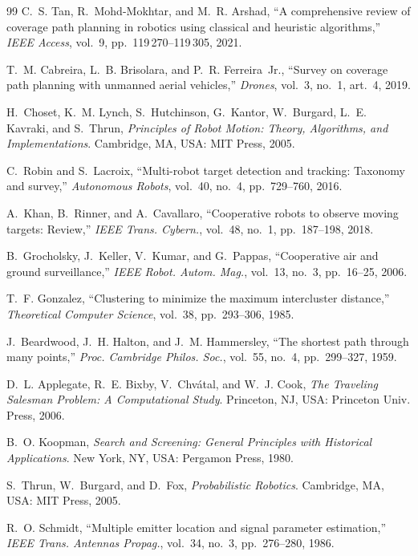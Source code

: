 \documentclass[preprint,12pt,3p]{elsarticle}
\theoremstyle{definition}
\begin{document}
\begin{thebibliography}{99}
C.~S. Tan, R.~Mohd-Mokhtar, and M.~R. Arshad, ``A comprehensive review of coverage path planning
in robotics using classical and heuristic algorithms,'' \emph{IEEE Access}, vol.~9,
pp.~119\,270--119\,305, 2021.

T.~M. Cabreira, L.~B. Brisolara, and P.~R. Ferreira~Jr., ``Survey on coverage path planning with
unmanned aerial vehicles,'' \emph{Drones}, vol.~3, no.~1, art.~4, 2019.

H.~Choset, K.~M. Lynch, S.~Hutchinson, G.~Kantor, W.~Burgard, L.~E. Kavraki, and S.~Thrun,
\emph{Principles of Robot Motion: Theory, Algorithms, and Implementations}. Cambridge, MA, USA:
MIT Press, 2005.

C.~Robin and S.~Lacroix, ``Multi-robot target detection and tracking: Taxonomy and survey,''
\emph{Autonomous Robots}, vol.~40, no.~4, pp.~729--760, 2016.

A.~Khan, B.~Rinner, and A.~Cavallaro, ``Cooperative robots to observe moving targets: Review,''
\emph{IEEE Trans. Cybern.}, vol.~48, no.~1, pp.~187--198, 2018.

B.~Grocholsky, J.~Keller, V.~Kumar, and G.~Pappas, ``Cooperative air and ground surveillance,''
\emph{IEEE Robot. Autom. Mag.}, vol.~13, no.~3, pp.~16--25, 2006.

T.~F. Gonzalez, ``Clustering to minimize the maximum intercluster distance,''
\emph{Theoretical Computer Science}, vol.~38, pp.~293--306, 1985.

J.~Beardwood, J.~H. Halton, and J.~M. Hammersley, ``The shortest path through many points,''
\emph{Proc. Cambridge Philos. Soc.}, vol.~55, no.~4, pp.~299--327, 1959.

D.~L. Applegate, R.~E. Bixby, V.~Chv\'atal, and W.~J. Cook, \emph{The Traveling Salesman
Problem: A Computational Study}. Princeton, NJ, USA: Princeton Univ. Press, 2006.

B.~O. Koopman, \emph{Search and Screening: General Principles with Historical Applications}.
New York, NY, USA: Pergamon Press, 1980.

S.~Thrun, W.~Burgard, and D.~Fox, \emph{Probabilistic Robotics}. Cambridge, MA, USA: MIT Press,
2005.

R.~O. Schmidt, ``Multiple emitter location and signal parameter estimation,''
\emph{IEEE Trans. Antennas Propag.}, vol.~34, no.~3, pp.~276--280, 1986.


\end{thebibliography}
\end{document}
